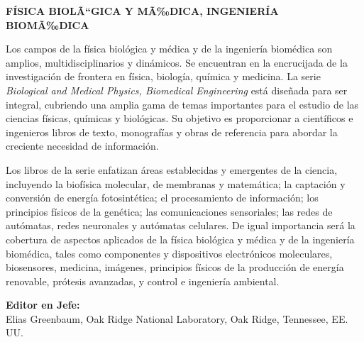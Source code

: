 ﻿\documentclass{book}
\begin{document}
\thispagestyle{empty}
\noindent\textbf{FÍSICA BIOLÃ``GICA Y MÃ‰DICA, INGENIERÍA BIOMÃ‰DICA}

\vspace{1em}
\noindent Los campos de la física biológica y médica y de la ingeniería biomédica son amplios, multidisciplinarios y dinámicos. Se encuentran en la encrucijada de la investigación de frontera en física, biología, química y medicina. La serie \textit{Biological and Medical Physics, Biomedical Engineering} está diseñada para ser integral, cubriendo una amplia gama de temas importantes para el estudio de las ciencias físicas, químicas y biológicas. Su objetivo es proporcionar a científicos e ingenieros libros de texto, monografías y obras de referencia para abordar la creciente necesidad de información.

\noindent Los libros de la serie enfatizan áreas establecidas y emergentes de la ciencia, incluyendo la biofísica molecular, de membranas y matemática; la captación y conversión de energía fotosintética; el procesamiento de información; los principios físicos de la genética; las comunicaciones sensoriales; las redes de autómatas, redes neuronales y autómatas celulares. De igual importancia será la cobertura de aspectos aplicados de la física biológica y médica y de la ingeniería biomédica, tales como componentes y dispositivos electrónicos moleculares, biosensores, medicina, imágenes, principios físicos de la producción de energía renovable, prótesis avanzadas, y control e ingeniería ambiental.

\vspace{1.5em}
\noindent\textbf{Editor en Jefe:} \\
Elias Greenbaum, Oak Ridge National Laboratory, Oak Ridge, Tennessee, EE. UU.
\end{document}
